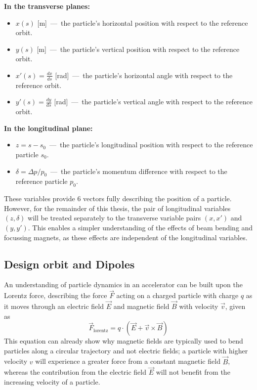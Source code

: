 \documentclass[11pt]{report}
\begin{document}
\noindent \textbf{In the transverse planes:}
\begin{itemize}
  \item $x(s)$ [m]~---~the particle's horizontal position with respect to the reference orbit.
  \item $y(s)$ [m]~---~the particle's vertical position with respect to the reference orbit.
  \item $x'(s)=\frac{dx}{ds}$ [rad]~---~the particle's horizontal angle with respect to the reference orbit.
  \item $y'(s)=\frac{dy}{ds}$ [rad]~---~the particle's vertical angle with respect to the reference orbit.
\end{itemize}
\textbf{In the longitudinal plane:}
\begin{itemize}
    \item $z=s-s_0$~---~the particle's longitudinal position with respect to the reference particle $s_0$.
    \item $\delta = \Delta p/p_0$~---~the particle's momentum difference with respect to the reference particle $p_0$.
\end{itemize} 

These variables provide 6 vectors fully describing the position of a particle. However, for the remainder of this thesis, the pair of longitudinal variables $(z, \delta)$ will be treated separately to the transverse variable pairs $(x, x')$ and $(y, y')$. This enables a simpler understanding of the effects of beam bending and focussing magnets, as these effects are independent of the longitudinal variables.

\subsection{Design orbit and Dipoles}

An understanding of particle dynamics in an accelerator can be built upon the Lorentz force, describing the force $\vec F$ acting on a charged particle with charge $q$ as it moves through an electric field $\vec E$ and magnetic field $\vec B$ with velocity $\vec v$, given as
\begin{equation}
\vec F_{\text{lorentz}} = q\cdot(\vec E+ \vec v\times\vec B)\label{eq:lorentz}
\end{equation}
This equation can already show why magnetic fields are typically used to bend particles along a circular trajectory and not electric fields; a particle with higher velocity $v$ will experience a greater force from a constant magnetic field $\vec B$, whereas the contribution from the electric field $\vec E$ will not benefit from the increasing velocity of a particle.
\end{document}

